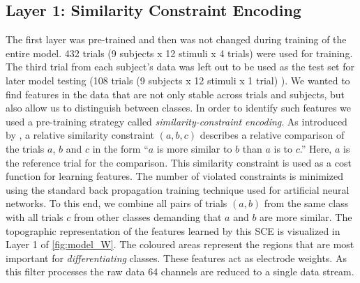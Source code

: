 \subsection*{Layer 1: Similarity Constraint Encoding}
The first layer was pre-trained and then was not changed during training of the entire model. 
432 trials (9 subjects x 12 stimuli x 4 trials) were used for training. 
The third trial from each subject's data was left out to be used as the test set for later model testing (108 trials (9 subjects x 12 stimuli x 1 trial) ).
We wanted to find features in the data that are not only stable across trials and subjects, but also allow us to distinguish between classes. 
In order to identify such features we used a pre-training strategy called \emph{similarity-constraint encoding}.
As introduced by \cite{schultz_learning_2004}, a relative similarity constraint $(a,b,c)$ describes a relative comparison of the trials $a$, $b$ and $c$ in the form ``$a$ is more similar to $b$ than $a$ is to $c$.''
Here, $a$ is the reference trial for the comparison.
This similarity constraint is used as a cost function for learning features. 
The number of violated constraints is minimized using the standard back propagation training technique used for artificial neural networks.
To this end, we combine all pairs of trials $(a,b)$ from the same class %
with all trials $c$ from other classes demanding that $a$ and $b$ are more similar.
The topographic representation of the features learned by this \ac{SCE} is visualized in Layer 1 of \autoref{fig:model_W}. 
The coloured areas represent the regions that are most important for \emph{differentiating} classes. 
These features act as electrode weights.
As this filter processes the raw data 64 channels are reduced to a single data stream. 


